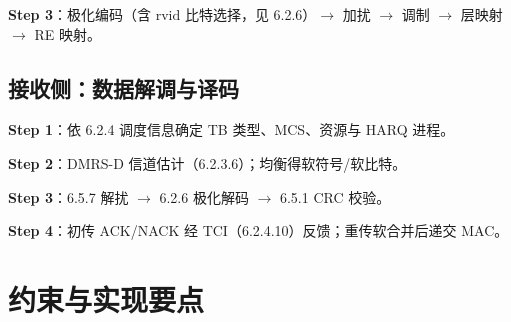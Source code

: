 \documentclass[11pt,a4paper]{ctexart}
\begin{document}
\textbf{Step 3}：极化编码（含 $\mathrm{rvid}$ 比特选择，见 6.2.6）$\rightarrow$ 加扰 $\rightarrow$ 调制 $\rightarrow$ 层映射 $\rightarrow$ RE 映射。

\subsection{接收侧：数据解调与译码}

\textbf{Step 1}：依 6.2.4 调度信息确定 TB 类型、MCS、资源与 HARQ 进程。

\textbf{Step 2}：DMRS-D 信道估计（6.2.3.6）；均衡得软符号/软比特。

\textbf{Step 3}：6.5.7 解扰 $\rightarrow$ 6.2.6 极化解码 $\rightarrow$ 6.5.1 CRC 校验。

\textbf{Step 4}：初传 ACK/NACK 经 TCI（6.2.4.10）反馈；重传软合并后递交 MAC。

\section{约束与实现要点}
\end{document}

